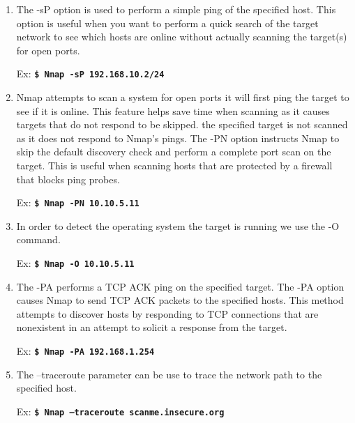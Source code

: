 \documentclass[12pt]{extarticle}
\newcommand{\code}[1]{\texttt{\bfseries#1}}
\begin{document}
\begin{enumerate}

\item The -sP option is used to perform a simple ping of the specified host. This option is useful when you want to perform a quick search of the target network to see which hosts are online without actually scanning the target(s) for open ports.\cite{cookbook}

Ex: \code{\$ Nmap -sP 192.168.10.2/24}

\item Nmap attempts to scan a system for open ports it will first ping the target to see if it is online. This feature helps save time when scanning as it causes targets that do not respond to be skipped. the specified target is not scanned as it does not respond to Nmap’s pings. The -PN option instructs Nmap to skip the default discovery check and perform a complete port scan on the target. This is useful when scanning hosts that are protected by a firewall that blocks ping probes.\cite{INmap} 

Ex: \code{\$ Nmap -PN 10.10.5.11}

\item In order to detect the operating system the target is running we use the -O command.\cite{INmap} 
 
Ex: \code{\$ Nmap -O 10.10.5.11}

\item The -PA performs a TCP ACK ping on the specified target. The -PA option causes Nmap to send TCP ACK packets to the specified hosts. This method attempts to discover hosts by responding to TCP connections that are nonexistent in an attempt to solicit a response from the target.\cite{INmap} 

Ex: \code{\$ Nmap -PA 192.168.1.254}

\item The --traceroute parameter can be use to trace the network path to the specified host.\cite{INmap} 

Ex: \code{\$ Nmap --traceroute scanme.insecure.org}

\end{enumerate}
\end{document}
